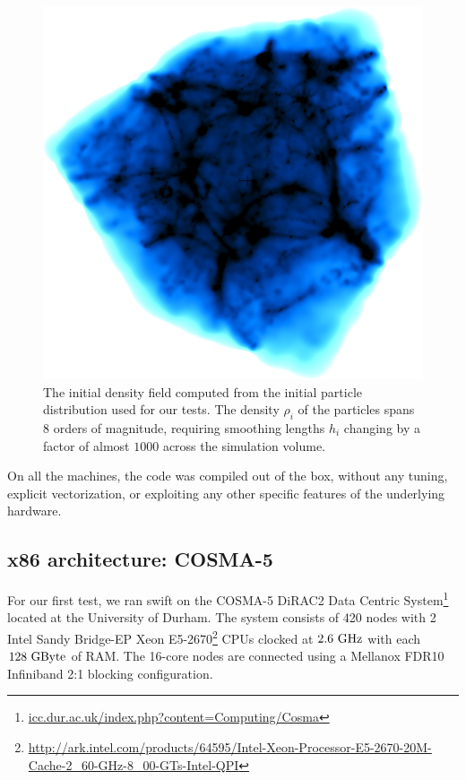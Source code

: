 \documentclass{sig-alternate-05-2015}
\newcommand{\swift}{{\sc swift}\xspace}
\begin{document}
\begin{figure}
\centering
\includegraphics[width=\columnwidth]{Figures/cosmoVolume}
\caption{The initial density field computed from the initial particle
  distribution used for our tests. The density $\rho_i$ of the particles spans 8
  orders of magnitude, requiring smoothing lengths $h_i$ changing by a factor of
  almost $1000$ across the simulation volume. \label{fig:ICs}}
\end{figure}  

On all the machines, the code was compiled out of the box,
without any tuning, explicit vectorization, or exploiting any
other specific features of the underlying hardware. 

\subsection{x86 architecture: COSMA-5}

For our first test, we ran \swift on the COSMA-5 DiRAC2 Data Centric
System\footnote{\url{icc.dur.ac.uk/index.php?content=Computing/Cosma}}
located at the University of Durham. The system consists of 420 nodes
with 2 Intel Sandy Bridge-EP Xeon
E5-2670\footnote{\url{http://ark.intel.com/products/64595/Intel-Xeon-Processor-E5-2670-20M-Cache-2_60-GHz-8_00-GTs-Intel-QPI}}
CPUs clocked at $2.6~\rm{GHz}$ with each $128~\rm{GByte}$ of RAM. The
16-core nodes are connected using a Mellanox FDR10 Infiniband 2:1 blocking
configuration.
\end{document}
